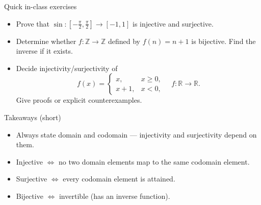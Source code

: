 \documentclass[11pt]{beamer}
\theoremstyle{plain}
\begin{document}
\begin{frame}{Quick in-class exercises}
  \begin{itemize}
    \item Prove that \(\sin\colon[-\tfrac{\pi}{2},\tfrac{\pi}{2}]\to[-1,1]\) is injective and surjective.
    \item Determine whether \(f\colon\mathbb{Z}\to\mathbb{Z}\) defined by \(f(n)=n+1\) is bijective. Find the inverse if it exists.
    \item Decide injectivity/surjectivity of
    \[
      f(x)=\begin{cases}
        x, & x\ge 0,\\
        x+1, & x<0,
      \end{cases}\quad f\colon\mathbb{R}\to\mathbb{R}.
    \]
    Give proofs or explicit counterexamples.
  \end{itemize}
\end{frame}

\begin{frame}{Takeaways (short)}
  \begin{itemize}
    \item Always state domain and codomain — injectivity and surjectivity depend on them.
    \item Injective \(\Leftrightarrow\) no two domain elements map to the same codomain element.
    \item Surjective \(\Leftrightarrow\) every codomain element is attained.
    \item Bijective \(\Leftrightarrow\) invertible (has an inverse function).
  \end{itemize}
\end{frame}
\end{document}
